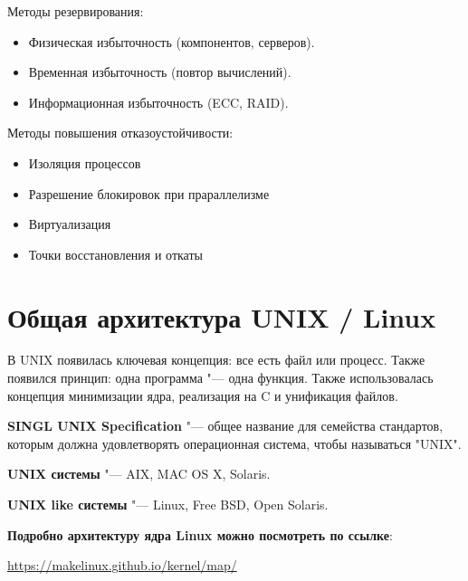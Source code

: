 \documentclass[bachelor, och, book]{SCWorks}
\theoremstyle{remark}
\begin{document}
    \hfill \break
    Методы резервирования: 
    \begin{itemize}[label=$\bullet$]
        \item Физическая избыточность (компонентов, серверов). 
        \item Временная избыточность (повтор вычислений).
        \item Информационная избыточность (ECC, RAID).
    \end{itemize}

    \hfill \break
    Методы повышения отказоустойчивости:

    \begin{itemize}[label=$\bullet$]
        \item Изоляция процессов 
        \item Разрешение блокировок при прараллелизме
        \item Виртуализация
        \item Точки восстановления и откаты
    \end{itemize}

    \section{Общая архитектура UNIX / Linux}
    В UNIX появилась ключевая концепция: все есть файл или процесс. Также появился принцип: одна программа "--- одна функция. Также использовалась концепция минимизации ядра, реализация на C и унификация файлов. 

    \textbf{SINGL UNIX Specification} "--- общее название для семейства стандартов, которым должна удовлетворять операционная система, чтобы называться "UNIX".

    \textbf{UNIX системы} "--- AIX, MAC OS X, Solaris.

    \textbf{UNIX like системы} "--- Linux, Free BSD, Open Solaris.

    \textbf{Подробно архитектуру ядра Linux можно посмотреть по ссылке}: 
    
    \href{https://makelinux.github.io/kernel/map/}{https://makelinux.github.io/kernel/map/}
\end{document}
